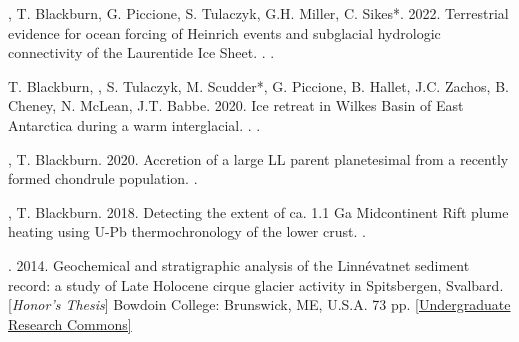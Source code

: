 \begin{etaremune} [itemsep=4pt, leftmargin=3ex]
    \item \ghedwards, T. Blackburn, G. Piccione, S. Tulaczyk, G.H. Miller, C. Sikes*. 2022. Terrestrial evidence for ocean forcing of Heinrich events and subglacial hydrologic connectivity of the Laurentide Ice Sheet. . .
    
    \item T. Blackburn, \ghedwards, S. Tulaczyk, M. Scudder*, G. Piccione, B. Hallet, J.C. Zachos, B. Cheney, N. McLean, J.T. Babbe. 2020. Ice retreat in Wilkes Basin of East Antarctica during a warm interglacial. . . 
    
    \item \ghedwards, T. Blackburn. 2020. Accretion of a large LL parent planetesimal from a recently formed chondrule population. . 
    
    \item \ghedwards, T. Blackburn. 2018. Detecting the extent of ca. 1.1 Ga Midcontinent Rift plume heating using U-Pb thermochronology of the lower crust. .  
    
    \item \ghedwards. 2014. Geochemical and stratigraphic analysis of the Linnévatnet sediment record: a study of Late Holocene cirque glacier activity in Spitsbergen, Svalbard. [\textit{Honor’s Thesis}] Bowdoin College: Brunswick, ME, U.S.A. 73 pp. \href{https://digitalcommons.bowdoin.edu/honorsprojects/12/}{[Undergraduate Research Commons]}

\end{etaremune}